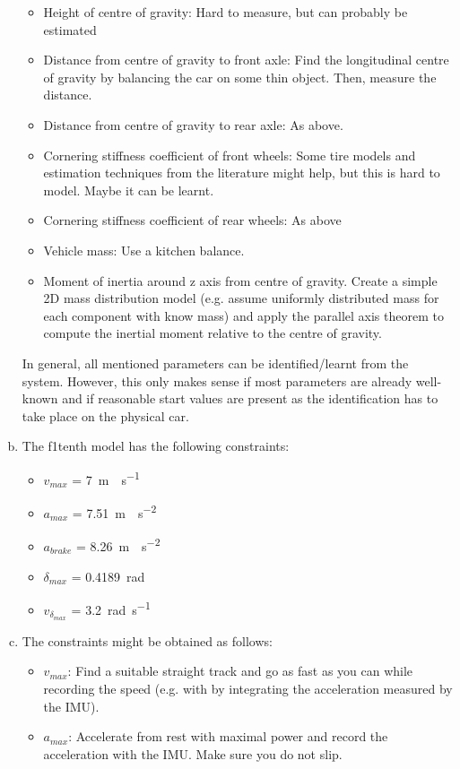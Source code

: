 \documentclass[letta4 paper]{article}
\numberwithin{equation}{section}
\newcommand{\0}{\mathbf{0}}
\begin{document}
\begin{enumerate}[a.) ]
\begin{itemize}
         \item Height of centre of gravity: Hard to measure, but can probably be estimated 
         \item Distance from centre of gravity to front axle: Find the longitudinal centre of gravity by balancing the car on some thin object. Then, measure the distance.
         \item Distance from centre of gravity to rear axle: As above.
         \item Cornering stiffness coefficient of front wheels: Some tire models and estimation techniques from the literature might help, but this is hard to model. Maybe it can be learnt.
         \item Cornering stiffness coefficient of rear wheels: As above
         \item Vehicle mass: Use a kitchen balance.
         \item Moment of inertia around z axis from centre of gravity. Create a simple 2D mass distribution model (e.g. assume uniformly distributed mass for each component with know mass) and apply the parallel axis theorem to compute the inertial moment relative to the centre of gravity.
      \end{itemize}
      In general, all mentioned parameters can be identified/learnt from the system. However, this only makes sense if most parameters are already well-known and if reasonable start values are present as the identification has to take place on the physical car.
      \item The f1tenth model has the following constraints: \begin{itemize}
         \item $v_{max}$ = \SI{7}{m\cdot s^{-1}}
         \item $a_{max}$ = \SI{7.51}{m\cdot s^{-2}}
         \item $a_{brake}$ = \SI{8.26}{m\cdot s^{-2}}
         \item $\delta_{max}$ = \SI{0.4189}{rad}
         \item $v_{\delta_{max}}$ = \SI{3.2}{rad s^{-1}}
      \end{itemize}
      \item The constraints might be obtained as follows: \begin{itemize}
         \item $v_{max}$: Find a suitable straight track and go as fast as you can while recording the speed (e.g. with by integrating the acceleration measured by the IMU).
         \item $a_{max}$: Accelerate from rest with maximal power and record the acceleration with the IMU. Make sure you do not slip.

\end{itemize}
\end{enumerate}
\end{document}
